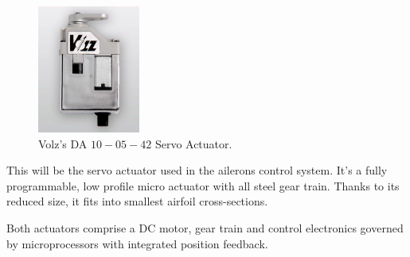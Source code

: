 \documentclass[english,fira]{ist-report}
\begin{document}
\begin{figure}[ht]
    \centering
    \includegraphics[width=0.3\textwidth]{graphics/AVIONICS/servoactuators.jpg}
    \caption{Volz’s DA $10-05-42$ Servo Actuator.}
    \label{fig:volzservoactuator}
\end{figure}

This will be the servo actuator used in the ailerons control system. It’s a fully programmable, low profile micro actuator with all steel gear train. Thanks to its reduced size, it fits into smallest airfoil cross-sections.\par 
Both actuators comprise a DC motor, gear train and control electronics governed by microprocessors with integrated position feedback.
\end{document}
